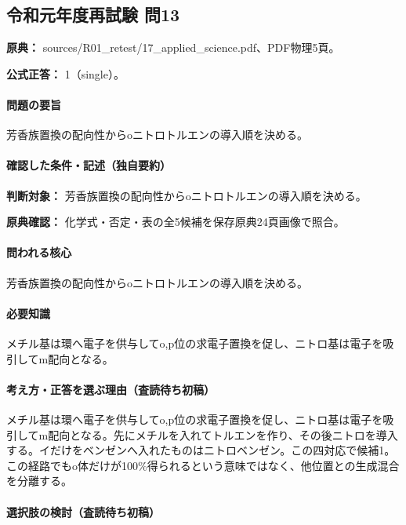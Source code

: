\subsection{令和元年度再試験 問13}
\label{q:r01-ret-applied-13}

\noindent\textbf{原典：} sources/R01\_retest/17\_applied\_science.pdf、PDF物理5頁。

\textbf{公式正答：} 1（single）。

\paragraph{問題の要旨} 芳香族置換の配向性からoニトロトルエンの導入順を決める。

\paragraph{確認した条件・記述（独自要約）}\mbox{}\par

\noindent\textbf{判断対象：} 芳香族置換の配向性からoニトロトルエンの導入順を決める。\par

\noindent\textbf{原典確認：} 化学式・否定・表の全5候補を保存原典24頁画像で照合。\par

\paragraph{問われる核心} 芳香族置換の配向性からoニトロトルエンの導入順を決める。

\paragraph{必要知識} メチル基は環へ電子を供与してo,p位の求電子置換を促し、ニトロ基は電子を吸引してm配向となる。

\paragraph{考え方・正答を選ぶ理由（査読待ち初稿）} メチル基は環へ電子を供与してo,p位の求電子置換を促し、ニトロ基は電子を吸引してm配向となる。先にメチルを入れてトルエンを作り、その後ニトロを導入する。イだけをベンゼンへ入れたものはニトロベンゼン。この四対応で候補1。この経路でもo体だけが100\%得られるという意味ではなく、他位置との生成混合を分離する。

\paragraph{選択肢の検討（査読待ち初稿）}\mbox{}\par

